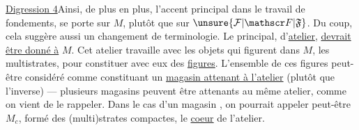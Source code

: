\uline{Digression 4}\quad Ainsi, de plus en plus, l'accent principal dans le travail de fondements, se porte sur $M$, plutôt que sur $\unsure{\mathcal F|\mathscr F|\mathfrak F}$. Du coup, cela suggère aussi un changement de terminologie. Le   principal, d'\uline{atelier}, \uline{devrait être donné à} $M$.
Cet atelier travaille avec les objets qui figurent dans $M$, les  multistrates, pour constituer avec eux des \uline{figures}. L'ensemble de ces figures peut-être considéré comme constituant un \uline{magasin attenant à l'atelier} (plutôt que l'inverse) --- plusieurs magasins peuvent être attenants au même atelier, comme on vient de le rappeler.
Dans le cas d'un magasin , on pourrait appeler peut-être $M_c$, formé des (multi)strates compactes, le \uline{coeur} de l'atelier.
